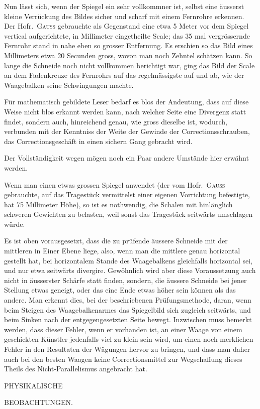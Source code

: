 Nun lässt sich, wenn der Spiegel ein sehr vollkommner ist, selbst eine
äusserst kleine Verrückung des Bildes sicher und scharf mit einem Fernrohre erkennen. Der Hofr.\ \textsc{Gauss} gebrauchte als Gegenstand eine etwa 5 Meter vor dem Spiegel vertical aufgerichtete, in Millimeter eingetheilte Scale; das 35 mal vergrössernde Fernrohr stand in nahe eben so grosser Entfernung. Es erschien so das Bild eines Millimeters etwa 20 Secunden gross, wovon man noch Zehntel schätzen kann. So lange die Schneide noch nicht vollkommen berichtigt war, ging das Bild der Scale an dem Fadenkreuze des Fernrohrs auf das regelmässigste auf und ab, wie der Waagebalken seine Schwingungen machte.

Für mathematisch gebildete Leser bedarf es blos der Andeutung, dass auf diese Weise nicht blos erkannt werden kann, nach welcher Seite eine Divergenz statt findet, sondern auch, hinreichend genau, wie gross dieselbe ist, wodurch, verbunden mit der Kenntniss der Weite der Gewinde der Correctionsschrauben, das Correctionsgeschäft in einen sichern Gang gebracht wird.

Der Vollständigkeit wegen mögen noch ein Paar andere Umstände hier erwähnt werden.

Wenn man einen etwas grossen Spiegel anwendet (der vom Hofr.\ \textsc{Gauss} gebrauchte, auf das Tragestück vermittelst einer eigenen Vorrichtung befestigte, hat 75 Millimeter Höhe), so ist es nothwendig, die Schalen mit hinlänglich schweren Gewichten zu belasten, weil sonst das Tragestück seitwärts umschlagen würde.

Es ist oben vorausgesetzt, dass die zu prüfende äussere Schneide mit der mittleren in Einer Ebene liege, also, wenn man die mittlere genau horizontal gestellt hat, bei horizontalem Stande des Waagebalkens gleichfalls horizontal sei, und nur etwa seitwärts divergire. Gewöhnlich wird aber diese Voraussetzung auch nicht in äusserster Schärfe statt finden, sondern, die äussere Schneide bei jener Stellung etwas geneigt, oder das eine Ende etwas höher sein können als das andere. Man erkennt dies, bei der beschriebenen Prüfungsmethode, daran, wenn beim Steigen des Waagebalkenarmes das Spiegelbild sich zugleich seitwärts, und beim Sinken nach der entgegengesetzten Seite bewegt. Inzwischen muss bemerkt werden, dass dieser Fehler, wenn er vorhanden ist, an einer Waage von einem geschickten Künstler jedenfalls viel zu klein sein wird, um einen noch merklichen Fehler in den Resultaten der Wägungen hervor zu bringen, und dass man daher auch bei den besten Waagen keine Correctionsmittel zur Wegschaffung dieses Theils des Nicht-Parallelismus angebracht hat.

\clearpage
\fancyhead[L]{}
\thispagestyle{empty}
\begin{center}
\vspace*{44mm}
{\LARGE PHYSIKALISCHE\par}
\vspace{24mm}
{\LARGE BEOBACHTUNGEN.\par}
\end{center}
\clearpage
